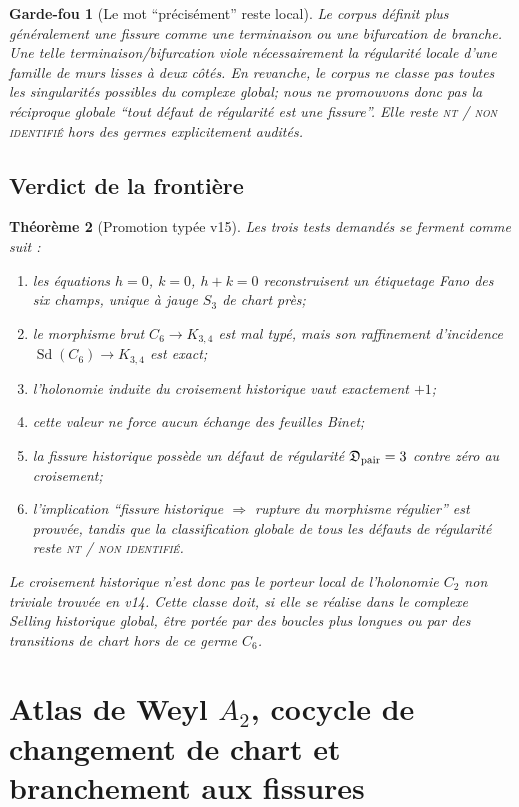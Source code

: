 \documentclass[11pt,a4paper]{article}
\newtheorem{theorem}{Théorème}[section]
\newtheorem{guardrail}[theorem]{Garde-fou}
\newcommand{\statusNT}{\textsc{nt / non identifié}}
\begin{document}
\begin{guardrail}[Le mot ``précisément'' reste local]
Le corpus définit plus généralement une fissure comme une terminaison ou une bifurcation de branche. Une telle terminaison/bifurcation viole nécessairement la régularité locale d'une famille de murs lisses à deux côtés. En revanche, le corpus ne classe pas toutes les singularités possibles du complexe global; nous ne promouvons donc pas la réciproque globale ``tout défaut de régularité est une fissure''. Elle reste \statusNT{} hors des germes explicitement audités.
\end{guardrail}

\subsection{Verdict de la frontière}

\begin{theorem}[Promotion typée v15]\label{thm:v15-verdict}
Les trois tests demandés se ferment comme suit :
\begin{enumerate}[label=\textup{(\roman*)}]
\item les équations $h=0$, $k=0$, $h+k=0$ reconstruisent un étiquetage Fano des six champs, unique à jauge $S_3$ de chart près;
\item le morphisme brut $C_6\to K_{3,4}$ est mal typé, mais son raffinement d'incidence $\operatorname{Sd}(C_6)\to K_{3,4}$ est exact;
\item l'holonomie induite du croisement historique vaut exactement $+1$;
\item cette valeur ne force aucun échange des feuilles Binet;
\item la fissure historique possède un défaut de régularité $\mathfrak D_{\rm pair}=3$ contre zéro au croisement;
\item l'implication ``fissure historique $\Rightarrow$ rupture du morphisme régulier'' est prouvée, tandis que la classification globale de tous les défauts de régularité reste \statusNT{}.
\end{enumerate}
Le croisement historique n'est donc pas le porteur local de l'holonomie $C_2$ non triviale trouvée en v14. Cette classe doit, si elle se réalise dans le complexe Selling historique global, être portée par des boucles plus longues ou par des transitions de chart hors de ce germe $C_6$.
\end{theorem}


\section{Atlas de Weyl \texorpdfstring{$A_2$}{A2}, cocycle de changement de chart et branchement aux fissures}\label{sec:v16-chart-cocycle}
\end{document}
